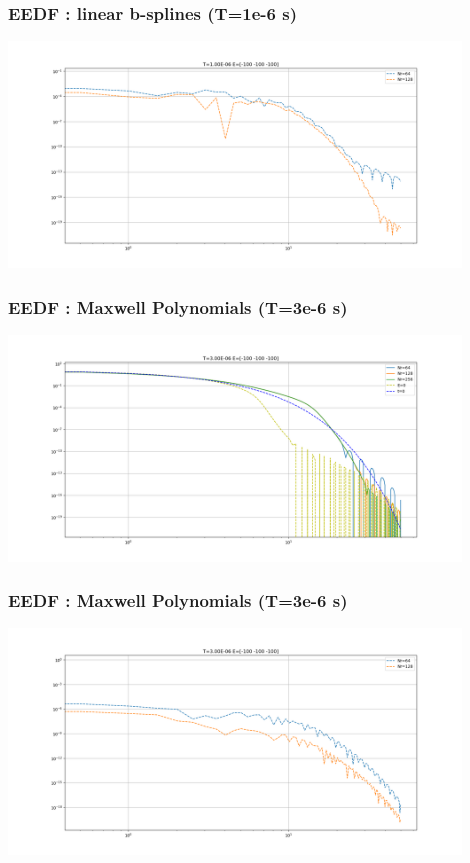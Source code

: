 \documentclass[mathserif, aspectratio=169]{beamer}
\begin{document}
\begin{frame}
	\frametitle{EEDF : linear b-splines (T=1e-6 s)}
	\begin{center}
		\includegraphics[width=0.9\textwidth]{figures/g0_1_bspline_eedf_conv.png}
	\end{center}
\end{frame}



\begin{frame}
	\frametitle{EEDF : Maxwell Polynomials (T=3e-6 s)}
	\begin{center}
		\includegraphics[width=0.9\textwidth]{figures/g0_3_maxwell_eedf.png}
	\end{center}
\end{frame}

\begin{frame}
	\frametitle{EEDF : Maxwell Polynomials (T=3e-6 s)}
	\begin{center}
		\includegraphics[width=0.9\textwidth]{figures/g0_3_maxwell_eedf_conv.png}
	\end{center}
\end{frame}
\end{document}
